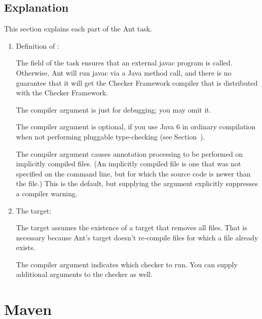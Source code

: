 \subsection{Explanation\label{ant-task-explanation}}

This section explains each part of the Ant task.

\begin{enumerate}
\item Definition of :

The  field of the  task
ensures that an external javac program is called.  Otherwise, Ant will run
javac via a Java method call, and there is no guarantee that it will get
the Checker Framework compiler that is distributed with the Checker Framework.

The  compiler argument is just for debugging; you may omit
it.

The  compiler argument is optional, if you use Java 6 in
ordinary compilation when not performing pluggable type-checking (see
Section~).

The  compiler argument causes annotation processing
to be performed on implicitly compiled files.  (An implicitly compiled file
is one that was not specified on the command line, but for which the source
code is newer than the  file.)  This is the default, but
supplying the argument explicitly suppresses a compiler warning.


\item The  target:

The target assumes the existence of a  target that removes all
 files.  That is necessary because Ant's  target
doesn't re-compile  files for which a  file
already exists.

The  compiler argument indicates which checker to
run.  You can supply additional arguments to the checker as well.

\end{enumerate}


\section{Maven\label{maven}}


